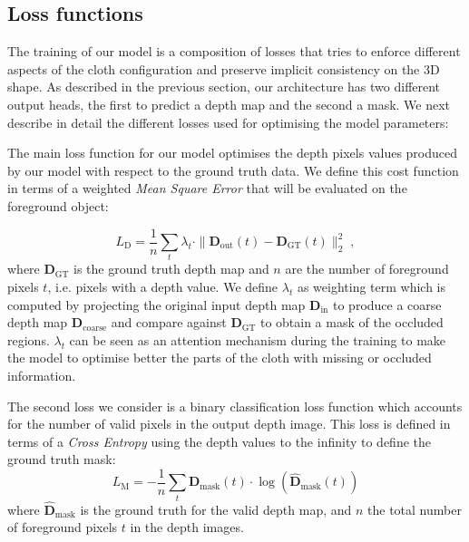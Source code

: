 \subsection{Loss functions}

The training of our model is a composition of losses that tries to enforce different aspects of the cloth configuration and preserve implicit consistency on the 3D shape. As described in the previous section, our architecture has two different output heads, the first to predict a depth map and the second a mask. We next describe in detail the different losses used for optimising the model parameters:

\vspace{1mm}
 The main loss function for our model optimises the depth pixels values produced by our model with respect to the ground truth data. We define this cost function in terms of a weighted \textit{Mean Square Error} that will be evaluated on the foreground object:

\begin{equation}
     L_\textrm{D} = \frac{1}{n}\sum_{t} \lambda_t \cdot \| \mathbf{D}_{\textrm{out}}(t) - \mathbf{D}_{\textrm{GT}}(t) \| _2 ^ 2\;,
\end{equation}
where $\mathbf{D}_{\textrm{GT}}$ is the ground truth depth map and $n$ are the number of foreground pixels $t$, i.e. pixels with a depth value. We define $\lambda_t$ as weighting term which is computed by projecting the original input depth map $\mathbf{D}_{\textrm{in}}$ to produce a coarse depth map $\mathbf{D}_{\textrm{coarse}}$ and compare against $\mathbf{D}_{\textrm{GT}}$ to obtain a mask of the occluded regions. $\lambda_t$ can be seen as an attention mechanism during the training to make the model to optimise better the parts of the cloth with missing or occluded information.

\vspace{1mm}
 The second loss we consider is a binary classification loss function which accounts for the number of valid pixels in the output depth image. This loss is defined in terms of a {\em Cross Entropy} using the depth values to the infinity to define the ground truth mask:
\begin{equation}
     L_\textrm{M} = - \frac{1}{n} \sum_{t} \mathbf{D}_{\text{mask}}(t) \cdot \log(\hat{\mathbf{D}}_{\text{mask}}(t))
\end{equation}
where $\hat{\mathbf{D}}_{\text{mask}}$ is the ground truth for the valid depth map, and $n$ the total number of foreground pixels $t$ in the depth images.

